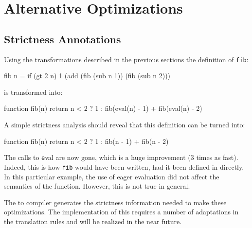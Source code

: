 \section{Alternative Optimizations}\label{sapljs:sec:optimizations}

\subsection{Strictness Annotations}
Using the transformations described in the previous sections the definition
of \texttt{fib}:
\begin{CleanCode}
fib n = if (gt 2 n) 1 (add (fib (sub n 1)) (fib (sub n 2)))
\end{CleanCode} 
is transformed into:
\begin{CleanCode}
function fib(n) {
    return n < 2 ? 1 : fib(eval(n) - 1) + fib(eval(n) - 2)
}
\end{CleanCode}
A simple strictness analysis should reveal that this definition can be turned into:
\begin{CleanCode}
function fib(n) {
    return n < 2 ? 1 : fib(n - 1) + fib(n - 2)
}
\end{CleanCode}
The calls to {\texttt eval} are now gone, which is a huge improvement (3 times as fast). Indeed,
this is how \texttt{fib} would have been written, had it been defined in \JavaScript
directly. In this particular example, the use of eager evaluation did not affect
the semantics of the function. However, this is not true in general. 

The \Clean to \Sapl compiler generates the strictness information needed to make these 
optimizations. The implementation of this requires a number of adaptations in the translation rules
and will be realized in the near future.


